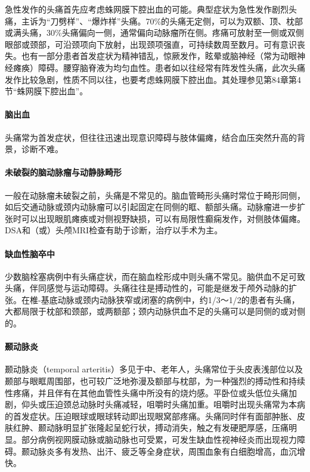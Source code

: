 急性发作的头痛首先应考虑蛛网膜下腔出血的可能。典型症状为急性发作剧烈头痛，主诉为“刀劈样”、“爆炸样”头痛。70\%的头痛无定侧，可以为双额、顶、枕部或满头痛，30\%头痛偏向一侧，通常偏向动脉瘤所在侧。疼痛可放射至一侧或双侧眼部或颈部，可沿颈项向下放射，出现颈项强直，可持续数周至数月。可有意识丧失。也有一部分患者首发症状为精神错乱，惊厥发作，眩晕或脑神经（常为动眼神经瘫痪）障碍。腰穿脑脊液为均匀血性。患者如以往经常有阵发性头痛，此次头痛发作比较急剧，性质不同以往，也要考虑蛛网膜下腔出血。其处理参见第84章第4节“蛛网膜下腔出血”。

\paragraph{脑出血}

头痛常为首发症状，但往往迅速出现意识障碍与肢体偏瘫，结合血压突然升高的背景，诊断不难。

\paragraph{未破裂的脑动脉瘤与动静脉畸形}

一般在动脉瘤未破裂之前，头痛是不常见的。脑血管畸形头痛时常位于畸形同侧，如后交通动脉或颈内动脉瘤可以引起固定在同侧的眶、额部头痛。动脉瘤进一步扩张时可以出现眼肌瘫痪或对侧视野缺损，可以有局限性癫痫发作，对侧肢体偏瘫。DSA和（或）头颅MRI检查有助于诊断，治疗以手术为主。

\paragraph{缺血性脑卒中}

少数脑栓塞病例中有头痛症状，而在脑血栓形成中则头痛不常见。脑供血不足可致头痛，伴同感觉与运动障碍。头痛往往是搏动性的，可能是继发于颅外动脉的扩张。在椎-基底动脉或颈内动脉狭窄或闭塞的病例中，约1/3～1/2的患者有头痛，大都局限于枕部和颈部，或两额部；颈内动脉供血不足的头痛可以是同侧的或对侧的。

\paragraph{颞动脉炎}

颞动脉炎（temporal
arteritis）多见于中、老年人，头痛常位于头皮表浅部位以及颞部与眼眶周围部，也可较广泛地弥漫及额部与枕部，为一种强烈的搏动性和持续性疼痛，并且伴有在其他血管性头痛中所没有的烧灼感。平卧位或头低位头痛加剧，仰头或压迫颈总动脉时头痛减轻，咀嚼时头痛加重。咀嚼时出现头痛常为本病的首发症状。压迫眼球或眼球转动即出现眼窝部疼痛。头痛同时伴有面部肿胀、皮肤红肿、颞动脉明显扩张隆起呈蛇行状，搏动消失，触之有发硬肥厚感，压痛明显。部分病例视网膜动脉或脑动脉也可受累，可发生缺血性视神经炎而出现视力障碍。颞动脉炎多有发热、出汗、疲乏等全身症状，周围血象有白细胞增高，血沉增快。

